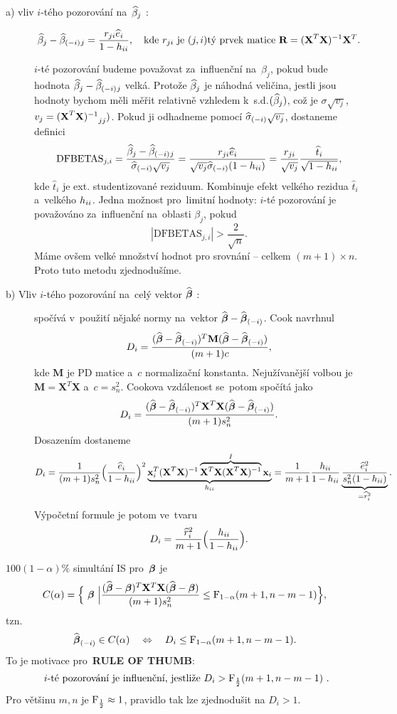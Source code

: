 \begin{description}
	\item[a) vliv $i$-tého pozorování na~$\widehat{\beta}_j$ :]
	 $$ \widehat{\beta}_j-\widehat{\beta}_{(-i)}{}_j = \frac{r_{ji}\widehat{e}_i}{1-h_{ii}},\quad\text{kde } r_{ji} \text{ je }(j,i)\text{tý prvek matice }\textbf{R} = {(\textbf{X}^T\textbf{X})^{-1}}\mathbf{X}^T. $$
	
	 $i$-té pozorování budeme považovat za~influenční na~$\beta_j$, pokud bude hodnota $\widehat{\beta}_j-\widehat{\beta}_{(-i)}{}_j$ velká. Protože $\widehat{\beta}_j$ je náhodná veličina, jestli jsou hodnoty  bychom měli měřit relativně vzhledem k~s.d.$(\widehat{\beta}_j)$, což je $\sigma\sqrt{v_j}$, $v_j = {(\textbf{X}^T\textbf{X})^{-1}}_{jj})$. Pokud ji odhadneme pomocí $\widehat{{\sigma}}_{(-i)}\sqrt{v_j}$, dostaneme definici
	 $$ \mathrm{DFBETAS}_{j,i} = \frac{\widehat{\beta}_j-\widehat{\beta}_{(-i)}{}_j}{\widehat{{\sigma}}_{(-i)}\sqrt{v_j}} = \frac{r_{ji}\widehat{e}_i}{\sqrt{v_j}\widehat{{\sigma}}_{(-i)}(1-h_{ii})} = \frac{r_{ji}}{\sqrt{v_j}}\frac{\widehat{t}_i}{\sqrt{1-h_{ii}}}, $$
	kde $\widehat{t}_i$ je ext. studentizované reziduum. Kombinuje efekt velkého rezidua $\widehat{t}_i$ a~velkého $h_{ii}$. Jedna možnost pro~limitní hodnoty: $i$-té pozorování je považováno za~influenční na~oblasti $\beta_j$, pokud
	 $$ |\mathrm{DFBETAS}_{j,i}|>\frac{2}{\sqrt{n}}. $$ Máme ovšem velké množství hodnot pro srovnání -- celkem $(m+1)\times n$. Proto tuto metodu zjednodušíme.

	\item[b) Vliv $i$-tého pozorování na~celý vektor $\widehat{\boldsymbol{\beta}}$ :]
	spočívá v~použití nějaké normy na~vektor \linebreak $\widehat{\boldsymbol{\beta}}-\widehat{\boldsymbol{\beta}}_{(-i)}$. Cook navrhnul
	 $$ D_i = \frac{(\widehat{\boldsymbol{\beta}}-\widehat{\boldsymbol{\beta}}_{(-i)})^T\textbf{M}(\widehat{\boldsymbol{\beta}}-\widehat{\boldsymbol{\beta}}_{(-i)})}{(m+1)c}, $$
	kde $\textbf{M}$ je PD matice a~$c$ normalizační konstanta. Nejužívanější volbou je $\textbf{M} = \textbf{X}^T\textbf{X}$ a~$c = s_n^2$. Cookova vzdálenost se~potom spočítá jako
	 $$ D_i = \frac{(\widehat{\boldsymbol{\beta}}-\widehat{\boldsymbol{\beta}}_{(-i)})^T\textbf{X}^T\textbf{X}(\widehat{\boldsymbol{\beta}}-\widehat{\boldsymbol{\beta}}_{(-i)})}{(m+1)s_n^2}. $$
	Dosazením dostaneme
	 $$ D_i = \frac{1}{(m+1)s_n^2}\Big(\frac{\widehat{e}_i}{1-h_{ii}}\Big)^2 \underbrace{\mathbf{x}_i^T{(\textbf{X}^T\textbf{X})^{-1}} \overbrace{\mathbf{X}^T\mathbf{X}{(\textbf{X}^T\textbf{X})^{-1}}}^I\mathbf{x}_i}_{h_{ii}} = \frac{1}{m+1}\frac{h_{ii}}{1-h_{ii}}\underbrace{\frac{\widehat{e}_i^2}{s_n^2(1-h_{ii})}}_{=\widehat{r}_i^2}. $$
	Výpočetní formule je potom ve~tvaru
	 $$ D_i = \frac{\widehat{r}_i^2}{m+1}\Big(\frac{h_{ii}}{1-h_{ii}}\Big). $$
\end{description}

\begin{remark}
	 $100(1-\alpha)\%$ simultání IS pro~$\boldsymbol{\beta}$ je $$ C(\alpha) = \Big\{ ~\boldsymbol{\beta}~\Big|\frac{(\widehat{\boldsymbol{\beta}}-\boldsymbol{\beta})^T\mathbf{X}^T\mathbf{X}(\widehat{\boldsymbol{\beta}}-\boldsymbol{\beta})}{(m+1)s_n^2}\leq \mathrm{F}_{1-\alpha}(m+1,n-m-1) \Big\}, $$
	tzn. $$ \widehat{\boldsymbol{\beta}}_{(-i)}\in C(\alpha)\quad \Leftrightarrow\quad D_i\leq \mathrm{F}_{1-\alpha}(m+1,n-m-1). $$
	To je motivace pro~\textbf{RULE OF THUMB}: $$ \text{ $i$-té pozorování je influenční, jestliže $D_i>\mathrm{F}_{\frac{1}{2}}(m+1,n-m-1)$ }.$$
	Pro většinu $m,n$ je $\mathrm{F}_{\frac{1}{2}}\approx1$, pravidlo tak lze zjednodušit na $D_i>1$.
\end{remark}

